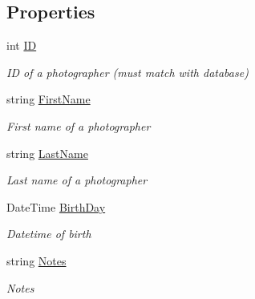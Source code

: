 \subsection*{Properties}
\begin{DoxyCompactItemize}
\item 
int \mbox{\hyperlink{class_pic_d_b_1_1_models_1_1_photographer_model_ab007cd91a9972d0174b0c779583c6a13}{ID}}
\begin{DoxyCompactList}\small\item\em ID of a photographer (must match with database) \end{DoxyCompactList}\item 
string \mbox{\hyperlink{class_pic_d_b_1_1_models_1_1_photographer_model_ab0d79d642139a5794ca0188ddc99631f}{First\+Name}}
\begin{DoxyCompactList}\small\item\em First name of a photographer \end{DoxyCompactList}\item 
string \mbox{\hyperlink{class_pic_d_b_1_1_models_1_1_photographer_model_a1710096c8908f2168d9073d064674005}{Last\+Name}}
\begin{DoxyCompactList}\small\item\em Last name of a photographer \end{DoxyCompactList}\item 
Date\+Time \mbox{\hyperlink{class_pic_d_b_1_1_models_1_1_photographer_model_a8891bafab54434615ac852032405b859}{Birth\+Day}}
\begin{DoxyCompactList}\small\item\em Datetime of birth \end{DoxyCompactList}\item 
string \mbox{\hyperlink{class_pic_d_b_1_1_models_1_1_photographer_model_ad1ea006c1eb7b95ea4091400c19bc31f}{Notes}}
\begin{DoxyCompactList}\small\item\em Notes \end{DoxyCompactList}\end{DoxyCompactItemize}


